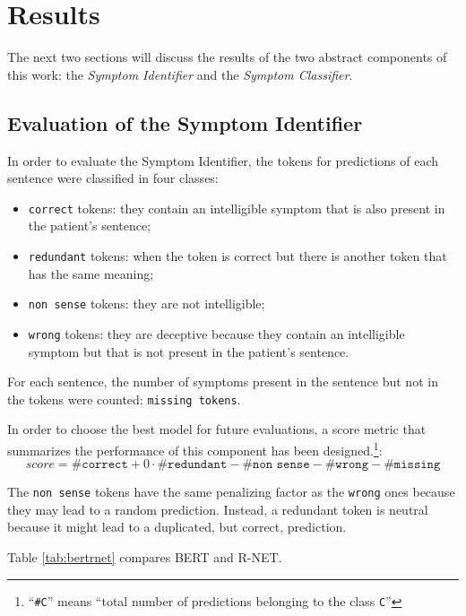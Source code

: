 \chapter{Results}
\label{cha:results}
The next two sections will discuss the results of the two abstract components of this work: the \textit{Symptom Identifier} and the \textit{Symptom Classifier}.

\section{Evaluation of the Symptom Identifier}
\label{sec:eval_symptom_identifier}
In order to evaluate the Symptom Identifier, the tokens for predictions of each sentence were classified in four classes:
\begin{itemize}
  \item \texttt{correct} tokens: they contain an intelligible symptom that is also present in the patient's sentence;
  \item \texttt{redundant} tokens: when the token is correct but there is another token that has the same meaning;
  \item \texttt{non sense} tokens: they are not intelligible;
  \item \texttt{wrong} tokens: they are deceptive because they contain an intelligible symptom but that is not present in the patient's sentence.
\end{itemize}

For each sentence, the number of symptoms present in the sentence but not in the tokens were counted: \texttt{missing tokens}.

In order to choose the best model for future evaluations, a score metric that summarizes the performance of this component has been designed.\footnote{``\texttt{\#C}'' means ``total number of predictions belonging to the class \texttt{C}''}:
\begin{equation}
score = \texttt{\#correct} + 0 \cdot \texttt{\#redundant} - \texttt{\#non sense} - \texttt{\#wrong} - \texttt{\#missing}
\end{equation}

The \texttt{non sense} tokens have the same penalizing factor as the \texttt{wrong} ones because they may lead to a random prediction. Instead, a redundant token is neutral because it might lead to a duplicated, but correct, prediction.

Table \ref{tab:bertrnet} compares BERT and R-NET.


